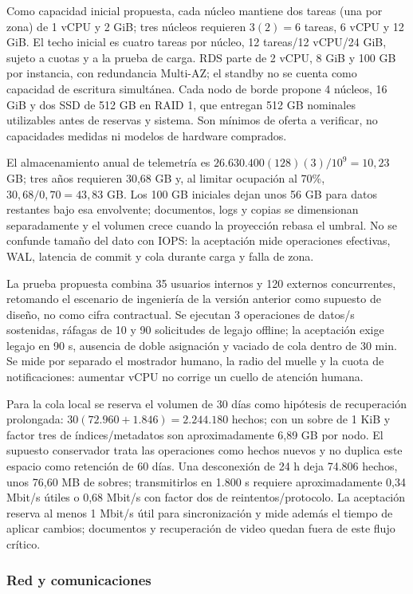 \documentclass[11pt,letterpaper]{report}
\begin{document}
Como capacidad inicial propuesta, cada núcleo mantiene dos tareas (una por zona) de 1 vCPU y 2 GiB; tres núcleos requieren $3(2)=6$ tareas, 6 vCPU y 12 GiB. El techo inicial es cuatro tareas por núcleo, 12 tareas/12 vCPU/24 GiB, sujeto a cuotas y a la prueba de carga. RDS parte de 2 vCPU, 8 GiB y 100 GB por instancia, con redundancia Multi-AZ; el standby no se cuenta como capacidad de escritura simultánea. Cada nodo de borde propone 4 núcleos, 16 GiB y dos SSD de 512 GB en RAID 1, que entregan 512 GB nominales utilizables antes de reservas y sistema. Son mínimos de oferta a verificar, no capacidades medidas ni modelos de hardware comprados.

El almacenamiento anual de telemetría es $26.630.400(128)(3)/10^9=10,23$ GB; tres años requieren 30,68 GB y, al limitar ocupación al 70\%, $30,68/0,70=43,83$ GB. Los 100 GB iniciales dejan unos 56 GB para datos restantes bajo esa envolvente; documentos, logs y copias se dimensionan separadamente y el volumen crece cuando la proyección rebasa el umbral. No se confunde tamaño del dato con IOPS: la aceptación mide operaciones efectivas, WAL, latencia de commit y cola durante carga y falla de zona.

La prueba propuesta combina 35 usuarios internos y 120 externos concurrentes, retomando el escenario de ingeniería de la versión anterior como supuesto de diseño, no como cifra contractual. Se ejecutan 3 operaciones de datos/s sostenidas, ráfagas de 10 y 90 solicitudes de legajo offline; la aceptación exige legajo en 90 s, ausencia de doble asignación y vaciado de cola dentro de 30 min. Se mide por separado el mostrador humano, la radio del muelle y la cuota de notificaciones: aumentar vCPU no corrige un cuello de atención humana.

Para la cola local se reserva el volumen de 30 días como hipótesis de recuperación prolongada: $30(72.960+1.846)=2.244.180$ hechos; con un sobre de 1 KiB y factor tres de índices/metadatos son aproximadamente 6,89 GB por nodo. El supuesto conservador trata las operaciones como hechos nuevos y no duplica este espacio como retención de 60 días. Una desconexión de 24 h deja 74.806 hechos, unos 76,60 MB de sobres; transmitirlos en 1.800 s requiere aproximadamente 0,34 Mbit/s útiles o 0,68 Mbit/s con factor dos de reintentos/protocolo. La aceptación reserva al menos 1 Mbit/s útil para sincronización y mide además el tiempo de aplicar cambios; documentos y recuperación de video quedan fuera de este flujo crítico. 

\subsubsection*{Red y comunicaciones}
\end{document}
